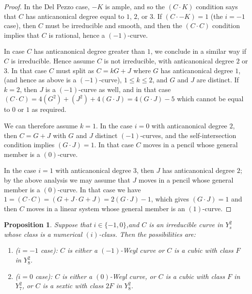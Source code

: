 \documentclass[12pt]{article}
\newtheorem{proposition}[equation]{Proposition}
\numberwithin{equation}{section}
\numberwithin{subeq}{equation}
\begin{document}
\begin{proof}
In the Del Pezzo case, $-K$ is ample,
and so the $(C \cdot K)$ condition says that 
$C$ has anticanonical degree equal to $1$, $2$, or $3$.
If $(C\cdot -K) = 1$ (the $i=-1$ case), then $C$ must be irreducible and smooth,
and then the $(C\cdot C)$ condition implies that $C$ is rational,
hence a $(-1)$-curve.

In case $C$ has anticanonical degree greater than $1$,
we conclude in a similar way if $C$ is irreducible.
Hence assume $C$ is not irreducible, with anticanonical degree $2$ or $3$.
In that case $C$ must split as $C = kG + J$ where $G$ has anticanonical degree $1$,
(and hence as above is a $(-1)$-curve),
$1 \leq k \leq 2$, and $G$ and $J$ are distinct.
If $k=2$, then $J$ is a $(-1)$-curve as well, and in that case
$(C \cdot C) = 4(G^2) + (J^2) + 4(G\cdot J) = 4(G\cdot J)-5$
which cannot be equal to $0$ or $1$ as required.

We can therefore assume $k=1$.
In the case $i=0$ with anticanonical degree $2$,
then $C = G+J$ with $G$ and $J$ distinct $(-1)$-curves,
and the self-intersection condition implies $(G\cdot J)=1$.
In that case $C$ moves in a pencil whose general member is a $(0)$-curve.

In the case $i=1$ with anticanonical degree $3$,
then $J$ has anticanonical degree $2$;
by the above analysis we may assume that $J$ moves in a pencil
whose general member is a $(0)$-curve.
In that case
we have $1 = (C \cdot C) = (G+J \cdot G+J) = 2(G\cdot J)-1$,
which gives $(G\cdot J)=1$ and then $C$ moves in a linear system
whose general member is an $(1)$-curve.
\end{proof}




\begin{proposition}\label{del}
Suppose that $i\in \{-1,0\}$,and $C$ is an irreducible curve in $Y^2_s$
whose class is a numerical $(i)$-class.  Then the possibilities are:
\begin{enumerate}
\item ($i=-1$ case): $C$ is either a $(-1)$-Weyl curve or $C$ is a cubic with class $F$ in $Y^2_8$.
\item ($i=0$ case): $C$ is either a $(0)$-Weyl curve, or $C$ is a cubic with class $F$ in $Y^2_7$, or $C$ is a sextic with class $2F$ in $Y^2_8$.
\end{enumerate}
\end{proposition}
\end{document}
